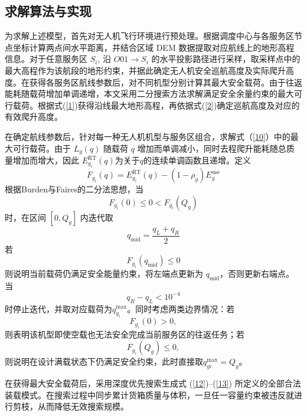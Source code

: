 \subsection{求解算法与实现}
为求解上述模型，首先对无人机飞行环境进行预处理。根据调度中心与各服务区节点坐标计算两点间水平距离，并结合区域 DEM 数据提取对应航线上的地形高程信息。对于任意服务区 $S_i$, 沿 $O01 \rightarrow S_i$ 的水平投影路径进行采样，取采样点中的最大高程作为该航段的地形约束，并据此确定无人机安全巡航高度及实际爬升高度。在获得各服务区航线参数后，对不同机型分别计算其最大安全载荷。由于往返能耗随载荷增加单调递增，本文采用二分搜索方法求解满足安全余量约束的最大可行载荷。根据式(\ref{1})获得沿线最大地形高程，再依据式(\ref{2})确定巡航高度及对应的有效爬升高度。

在确定航线参数后，针对每一种无人机机型与服务区组合，求解式（\ref{10}）中的最大可行载荷。由于 $L_g(q)$ 随载荷 $q$ 增加而单调减小，同时去程爬升能耗随总质量增加而增大，因此 $E_{g_i}^{\text{RT}}(q)$为关于$q$的连续单调函数且递增。定义
\begin{equation}\label{23}
	F_{g_i}(q) = E_{g_i}^{\text{RT}}(q) - (1 - \rho_g)E_g^{\text{use}}
\end{equation} 
根据Burden与Faires的二分法思想\cite{burden2015numerical}，当
\begin{equation}\label{24}
	F_{g_i}(0) \le 0 < F_{g_i}(Q_g)
\end{equation} 
时，在区间 $[0, Q_g]$ 内迭代取
\begin{equation}\label{25}
	q_{\text{mid}} = \frac{q_L + q_R}{2} \end{equation} 
若
\begin{equation}\label{26}
	F_{g_i}(q_{\text{mid}}) \le 0
\end{equation} 
则说明当前载荷仍满足安全能量约束，将左端点更新为 $q_{\text{mid}}$，否则更新右端点。当
\begin{equation}\label{27}
	q_R - q_L < 10^{-4}
\end{equation} 
时停止迭代，并取对应载荷为$q_{g_i}^{\max}$。同时考虑两类边界情况：若
\begin{equation}\label{28}
	F_{g_i}(0) > 0,
\end{equation}
则表明该机型即使空载也无法安全完成当前服务区的往返任务；若
\begin{equation}\label{29}
	F_{g_i}(Q_g) \le 0,
\end{equation}
则说明在设计满载状态下仍满足安全约束，此时直接取$q_{gi}^{\max} = Q_g$。 

在获得最大安全载荷后，采用深度优先搜索生成式 (\ref{12})--(\ref{13}) 所定义的全部合法装载模式。在搜索过程中同步累计货箱质量与体积，一旦任一容量约束被违反就进行剪枝，从而降低无效搜索规模。

